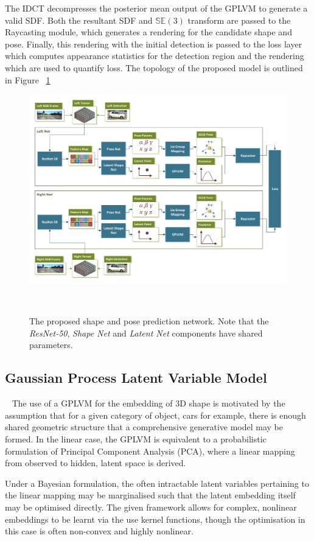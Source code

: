 The IDCT decompresses the posterior mean output of the GPLVM to generate a valid SDF\@. Both the 
resultant SDF and \( \mathbb{SE}(3) \) transform are passed to the Raycasting module, which generates 
a rendering for the candidate shape and pose. Finally, this rendering with the initial detection is passed 
to the loss layer which computes appearance statistics for the detection region and the rendering 
which are used to quantify loss. The topology of the proposed model is outlined in Figure
~\ref{figure:spp_pipeline}
\begin{figure}[!htbp]
  \centering
  \includegraphics[width=0.95\linewidth]{figures/spp/model.pdf}
  \caption[Shape and Pose Prediction Network]{The proposed shape and pose prediction network. 
  Note that the \textit{ResNet-50}, \textit{Shape Net} and \textit{Latent Net} components have 
  shared parameters.}
~\label{figure:spp_pipeline}
\end{figure}

\subsection{Gaussian Process Latent Variable Model}
~\label{subsec:spp_gplvm}
The use of a GPLVM for the embedding of 3D shape is motivated by the assumption that for a 
given category of object, cars for example, there is enough shared geometric structure that 
a comprehensive generative model may be formed. In the linear case, the GPLVM is equivalent 
to a probabilistic formulation of Principal Component Analysis (PCA), where a linear mapping 
from observed to hidden, latent space is derived. 

Under a Bayesian formulation, the often intractable latent variables pertaining to the linear 
mapping may be marginalised such that the latent embedding itself may be optimised directly. The 
given framework allows for complex, nonlinear embeddings to be learnt via the use kernel functions, 
though the optimisation in this case is often non-convex and highly nonlinear.

